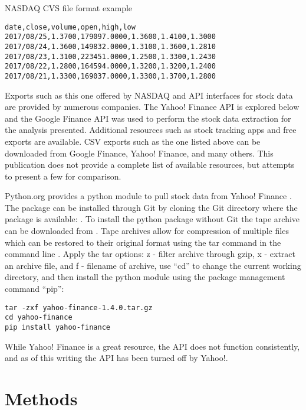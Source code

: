 \documentclass[sigconf]{acmart}
\begin{document}
\begin{table}[htb]
\caption{NASDAQ CVS file format example}\label{T:nasdaq} 
\begin{verbatim}
date,close,volume,open,high,low
2017/08/25,1.3700,179097.0000,1.3600,1.4100,1.3000
2017/08/24,1.3600,149832.0000,1.3100,1.3600,1.2810
2017/08/23,1.3100,223451.0000,1.2500,1.3300,1.2430
2017/08/22,1.2800,164594.0000,1.3200,1.3200,1.2400
2017/08/21,1.3300,169037.0000,1.3300,1.3700,1.2800
\end{verbatim}
\end{table}


Exports such as this one offered by NASDAQ and API interfaces for stock data are provided by numerous companies. The Yahoo! Finance API is explored below and the Google Finance API was used to perform the stock data extraction for the analysis presented. Additional resources such as stock tracking apps and free exports are available. CSV exports such as the one listed above can be downloaded from Google Finance, Yahoo! Finance, and many others. This publication does not provide a complete list of available resources, but attempts to present a few for comparison. 

Python.org provides a python module to pull stock data from Yahoo! Finance \cite{www-python-yahoo}. The package can be installed through Git by cloning the Git directory where the package is available: \cite{www-yahooStock}. To install the python package without Git the tape archive can be downloaded from \cite{www-pythonYahooStock}.  Tape archives allow for compression of multiple files which can be restored to their original format using the tar command in the command line \cite{www-tar}.  Apply the tar options: z - filter archive through gzip, x - extract an archive file, and f - filename of archive, use ``cd'' to change the current working directory, and then install the python module using the package management command ``pip'':
\begin{verbatim}
tar -zxf yahoo-finance-1.4.0.tar.gz
cd yahoo-finance
pip install yahoo-finance
\end{verbatim}
While Yahoo! Finance is a great resource, the API does not function consistently, and as of this writing the API has been turned off by Yahoo!.


\section{Methods}
\end{document}
